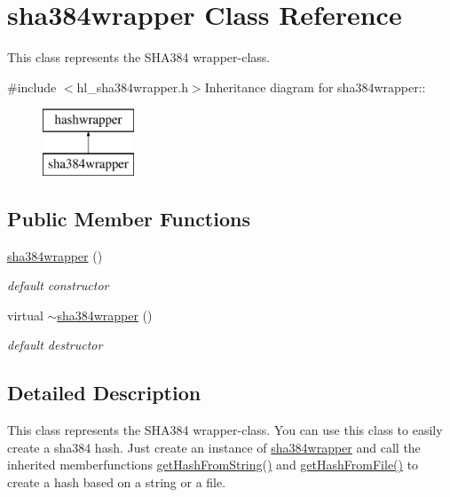 \hypertarget{classsha384wrapper}{
\section{sha384wrapper Class Reference}
\label{classsha384wrapper}
}


This class represents the SHA384 wrapper-\/class.  


{\ttfamily \#include $<$hl\_\-sha384wrapper.h$>$}Inheritance diagram for sha384wrapper::\begin{figure}[H]
\begin{center}
\leavevmode
\includegraphics[height=2cm]{classsha384wrapper}
\end{center}
\end{figure}
\subsection*{Public Member Functions}
\begin{DoxyCompactItemize}
\item 
\hyperlink{classsha384wrapper_aa0e4f55fb4be6e3b8dea70a4cc4bcd8e}{sha384wrapper} ()
\begin{DoxyCompactList}\small\item\em default constructor \item\end{DoxyCompactList}\item 
virtual \hyperlink{classsha384wrapper_a6e77b7bef7fbfb01d6c33c96d46ebf24}{$\sim$sha384wrapper} ()
\begin{DoxyCompactList}\small\item\em default destructor \item\end{DoxyCompactList}\end{DoxyCompactItemize}


\subsection{Detailed Description}
This class represents the SHA384 wrapper-\/class. You can use this class to easily create a sha384 hash. Just create an instance of \hyperlink{classsha384wrapper}{sha384wrapper} and call the inherited memberfunctions \hyperlink{classhashwrapper_aa10904f0dc06eb54771ab26864622d0f}{getHashFromString()} and \hyperlink{classhashwrapper_ae4767e76e6d9e2b24b41f01ab9e7f03c}{getHashFromFile()} to create a hash based on a string or a file.

